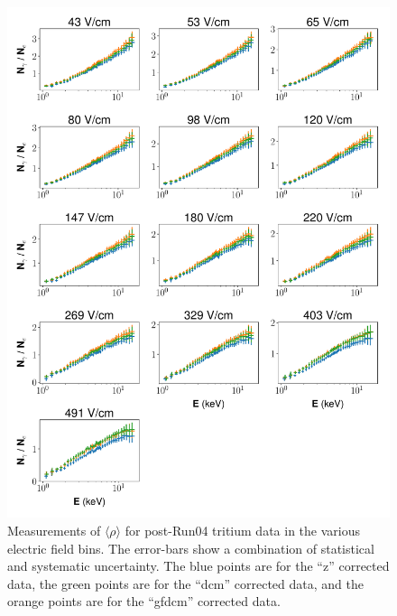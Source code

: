 \begin{figure}[!h]
\centering
  \includegraphics[width=\textwidth]{Figures/H3_rho_final.pdf}
\caption{Measurements of $\langle \rho \rangle$ for post-Run04 tritium data in the various electric field bins. The error-bars show a combination of statistical and systematic uncertainty. The blue points are for the ``z'' corrected data, the green points are for the ``dcm'' corrected data, and the orange points are for the ``gfdcm'' corrected data.}
\label{fig:H3_rho_final}
\end{figure}

\clearpage
